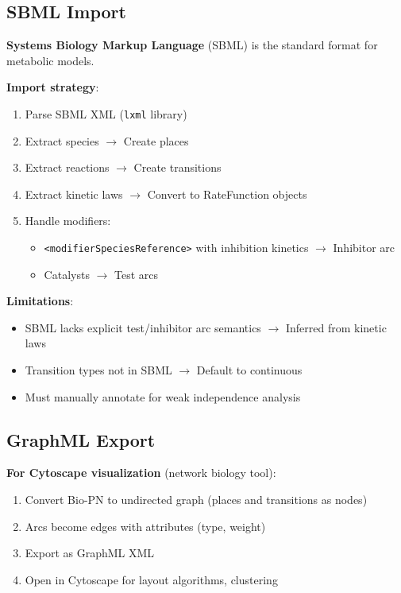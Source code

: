 \subsection{SBML Import}
\label{subsec:sbml-import}

\textbf{Systems Biology Markup Language} (SBML) is the standard format for metabolic models.

\textbf{Import strategy}:

\begin{enumerate}
    \item Parse SBML XML (\texttt{lxml} library)
    \item Extract species $\to$ Create places
    \item Extract reactions $\to$ Create transitions
    \item Extract kinetic laws $\to$ Convert to RateFunction objects
    \item Handle modifiers:
    \begin{itemize}
        \item \texttt{<modifierSpeciesReference>} with inhibition kinetics $\to$ Inhibitor arc
        \item Catalysts $\to$ Test arcs
    \end{itemize}
\end{enumerate}

\textbf{Limitations}:

\begin{itemize}
    \item SBML lacks explicit test/inhibitor arc semantics $\to$ Inferred from kinetic laws
    \item Transition types not in SBML $\to$ Default to continuous
    \item Must manually annotate for weak independence analysis
\end{itemize}

\subsection{GraphML Export}
\label{subsec:graphml-export}

\textbf{For Cytoscape visualization} (network biology tool):

\begin{enumerate}
    \item Convert Bio-PN to undirected graph (places and transitions as nodes)
    \item Arcs become edges with attributes (type, weight)
    \item Export as GraphML XML
    \item Open in Cytoscape for layout algorithms, clustering
\end{enumerate}

